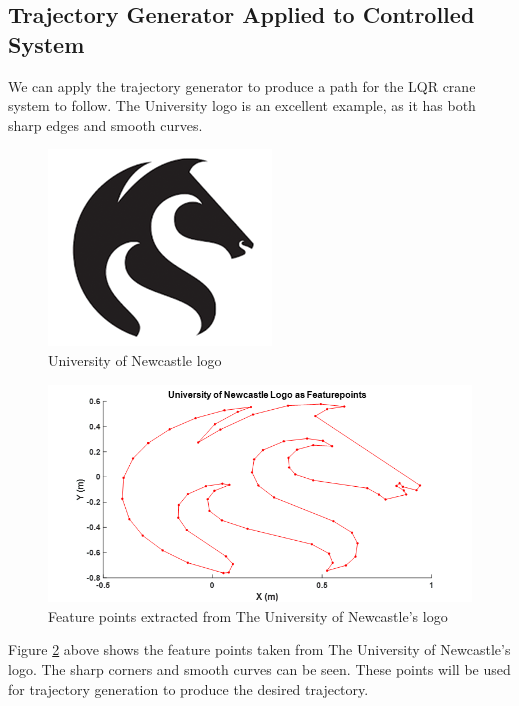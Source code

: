 \documentclass{UoNMCHA}
\numberwithin{equation}{section}
\begin{document}
	
	\subsection{Trajectory Generator Applied to Controlled System}
	
	We can apply the trajectory generator to produce a path for the LQR crane system to follow. The University logo is an excellent example, as it has both sharp edges and smooth curves. 
	
	
	\begin{figure}[H]
		\begin{center}
			\includegraphics[width=.5\linewidth]{figs/Picture21}
			\caption{University of Newcastle logo}
			\label{figs/Picture21}
		\end{center}
	\end{figure}
	
	
	\begin{figure}[H]
		\begin{center}
			\includegraphics[width=.8\linewidth]{figs/Picture22}
			\caption{Feature points extracted from The University of Newcastle's logo}
			\label{figs/Picture22}
		\end{center}
	\end{figure}
	
	Figure \ref{figs/Picture22} above shows the feature points taken from The University of Newcastle's logo. The sharp corners and smooth curves can be seen. These points will be used for trajectory generation to produce the desired trajectory. 
	
\end{document}
